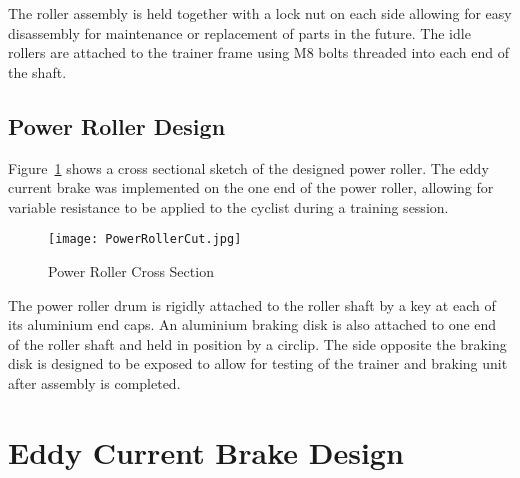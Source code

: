 \vspace*{-0.9cm}

The roller assembly is held together with a lock nut on each side allowing for easy disassembly for maintenance or replacement of parts in the future. The idle rollers are attached to the trainer frame using M8 bolts threaded into each end of the shaft.

\vspace*{-0.5cm}

\subsection{Power Roller Design}

Figure~\ref{fig:rollerCAD} shows a cross sectional sketch of the designed power roller. The eddy current brake was implemented on the one end of the power roller, allowing for variable resistance to be applied to the cyclist during a training session.

\vspace*{-0.4cm}

\begin{figure}[H]
	\centering
	\texttt{[image: PowerRollerCut.jpg]}
	\caption{Power Roller Cross Section}
	\label{fig:rollerCAD}
\end{figure}

The power roller drum is rigidly attached to the roller shaft by a key at each of its aluminium end caps. An aluminium braking disk is also attached to one end of the roller shaft and held in position by a circlip. The side opposite the braking disk is designed to be exposed to allow for testing of the trainer and braking unit after assembly is completed.


\section{Eddy Current Brake Design}
\label{sec:Eddy}


